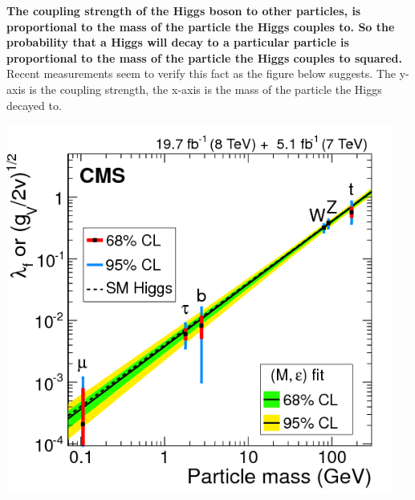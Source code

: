 {\bf The coupling strength of the Higgs boson to other particles, is proportional to the mass of the particle the Higgs couples to. So the probability that a Higgs will decay to a particular particle is proportional to the mass of the particle the Higgs couples to squared.}
Recent measurements seem to verify this fact as the figure below suggests. The y-axis is the coupling strength, the x-axis is the mass of the particle the Higgs decayed to.
\begin{center}
\includegraphics[width=0.95\textwidth]{fig/higgs/cms_higgs_couplings.png}
\end{center}


